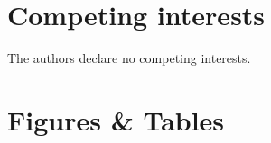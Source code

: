 \documentclass[fleqn,10pt]{wlscirep}
\providecommand{\DIFaddbegin}{} %
\providecommand{\DIFaddend}{} %
\providecommand{\DIFdelbegin}{} %
\providecommand{\DIFdelend}{} %
\begin{document}
\DIFdelbegin %

\DIFdelend \section*{Competing interests} %
\DIFaddbegin {}
\DIFaddend The authors declare no competing interests.

\newpage
\section*{Figures \& Tables}
\DIFdelbegin %



\end{document}
